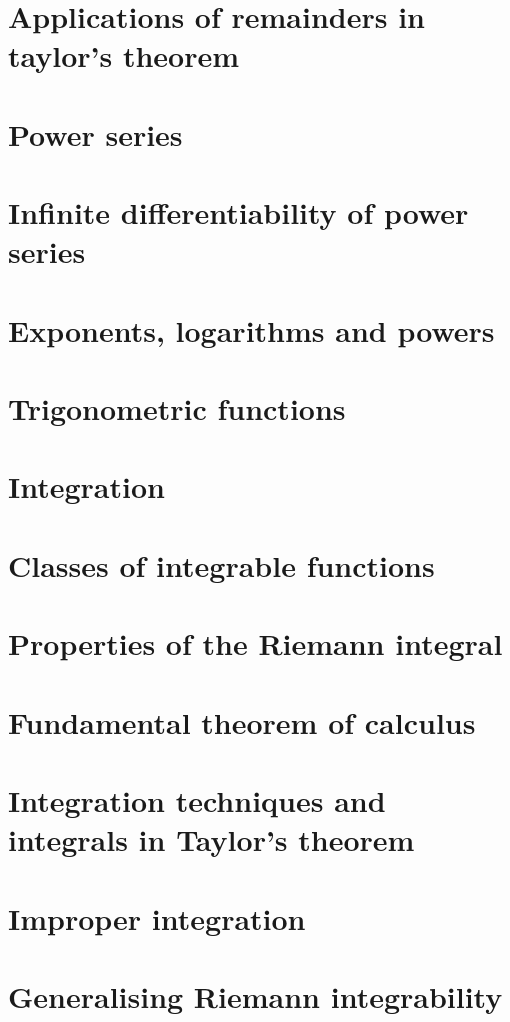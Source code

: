 \documentclass{article}
\begin{document}
\section{Applications of remainders in taylor's theorem}

\section{Power series}

\section{Infinite differentiability of power series}

\section{Exponents, logarithms and powers}

\section{Trigonometric functions}

\section{Integration}

\section{Classes of integrable functions}

\section{Properties of the Riemann integral}

\section{Fundamental theorem of calculus}

\section{Integration techniques and integrals in Taylor's theorem}

\section{Improper integration}

\section{Generalising Riemann integrability}

\end{document}
